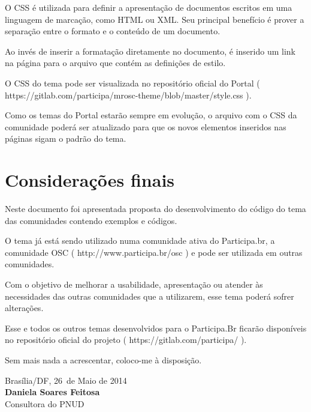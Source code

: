 \documentclass[[a4paper,11pt]{article}
\newcommand{\MyName}{Daniela Soares Feitosa}
\newcommand{\MesEntrega}{Maio de 2014}
\newcommand{\DiaEntrega}{26}
\begin{document}
O CSS é utilizada para definir a apresentação de documentos escritos em
uma linguagem de marcação, como HTML ou XML. Seu principal benefício é
prover a separação entre o formato e o conteúdo de um documento.

Ao invés de inserir a formatação diretamente no documento, é inserido
um link na página para o arquivo que contém as definições de estilo.

O CSS do tema pode ser visualizada no repositório oficial do Portal
( https://gitlab.com/participa/mrosc-theme/blob/master/style.css ). 

Como os temas do Portal estarão sempre em evolução, o arquivo com o CSS da
comunidade poderá ser atualizado para que os novos elementos
inseridos nas páginas sigam o padrão do tema.

\newpage

\section{Considerações finais}

Neste documento foi apresentada proposta do desenvolvimento do código do tema
das comunidades contendo exemplos e códigos.

O tema já está sendo utilizado numa comunidade ativa do Participa.br, a
comunidade OSC ( http://www.participa.br/osc ) e pode ser utilizada em outras
comunidades.

Com o objetivo de melhorar a usabilidade, apresentação ou atender às
necessidades das outras comunidades que a utilizarem, esse
tema poderá sofrer alterações.

Esse e todos os outros temas desenvolvidos para o Participa.Br ficarão
disponíveis no repositório oficial do projeto ( https://gitlab.com/participa/ ).

\vspace{1cm}

Sem mais nada a acrescentar, coloco-me à disposição.

\vspace{1cm}

\begin{minipage}{\textwidth}
  Brasília/DF, \DiaEntrega \ de \MesEntrega\\[1cm]
  \textbf{\MyName}\\
  \small Consultora do PNUD
\end{minipage}

\newpage
\appendix
\appendixpage

\end{document}
